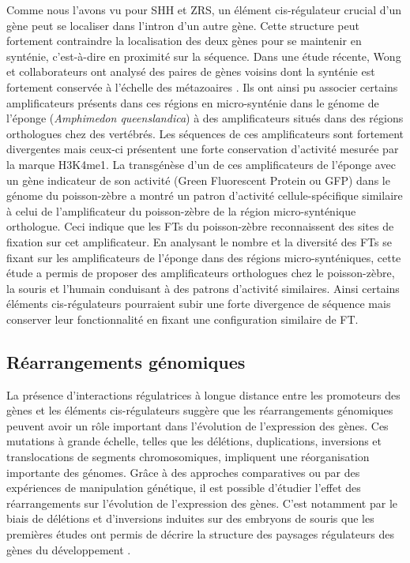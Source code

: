 Comme nous l’avons vu pour \acrshort{SHH} et \acrshort{ZRS}, un élément \gls{cis}-régulateur crucial d’un gène peut se localiser dans l’intron d’un autre gène. Cette structure peut fortement contraindre la localisation des deux gènes pour se maintenir en synténie, c'est-à-dire en proximité sur la séquence. Dans une étude récente, Wong et collaborateurs ont analysé des paires de gènes voisins dont la synténie est fortement conservée à l’échelle des métazoaires \citep{wong_deep_2020}. Ils ont ainsi pu associer certains \glspl{amplificateur} présents dans ces régions en micro-synténie dans le génome de l’éponge (\textit{Amphimedon queenslandica}) à des \glspl{amplificateur} situés dans des régions orthologues chez des vertébrés. Les séquences de ces \glspl{amplificateur} sont fortement divergentes mais ceux-ci présentent une forte conservation d’activité mesurée par la marque H3K4me1. La transgénèse d’un de ces \glspl{amplificateur} de l’éponge avec un gène indicateur de son activité (Green Fluorescent Protein ou \acrshort{GFP}) dans le génome du poisson-zèbre a montré un patron d’activité cellule-spécifique similaire à celui de l’\gls{amplificateur} du poisson-zèbre de la région micro-synténique orthologue. Ceci indique que les \acrshort{FT}s du poisson-zèbre reconnaissent des sites de fixation sur cet \gls{amplificateur}. En analysant le nombre et la diversité des \acrshort{FT}s se fixant sur les \glspl{amplificateur} de l’éponge dans des régions micro-synténiques, cette étude a permis de proposer des \glspl{amplificateur} orthologues chez le poisson-zèbre, la souris et l’humain conduisant à des patrons d’activité similaires. Ainsi certains éléments \gls{cis}-régulateurs pourraient subir une forte divergence de séquence mais conserver leur fonctionnalité en fixant une configuration similaire de \acrshort{FT}.

\subsection{Réarrangements génomiques}
\label{subsec:rearrangement}

La présence d’interactions régulatrices à longue distance entre les promoteurs des gènes et les éléments \gls{cis}-régulateurs suggère que les réarrangements génomiques peuvent avoir un rôle important dans l’évolution de l’expression des gènes. Ces mutations à grande échelle, telles que les délétions, duplications, inversions et translocations de segments chromosomiques, impliquent une réorganisation importante des génomes. Grâce à des approches comparatives ou par des expériences de manipulation génétique, il est possible d’étudier l’effet des réarrangements sur l’évolution de l’expression des gènes. C’est notamment par le biais de délétions et d’inversions induites sur des embryons de souris que les premières études ont permis de décrire la structure des paysages régulateurs des gènes du développement \citep{tschopp_genetic_2011}. \\

